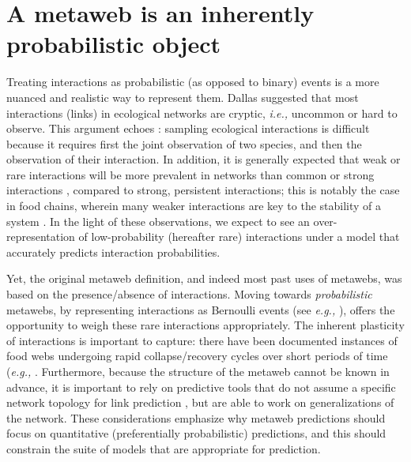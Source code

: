 \section{A metaweb is an inherently probabilistic
object}\label{a-metaweb-is-an-inherently-probabilistic-object}

Treating interactions as probabilistic (as opposed to binary) events is
a more nuanced and realistic way to represent them.
Dallas \cite{Dallas2017Predicting} suggested that most interactions (links) in
ecological networks are cryptic, \emph{i.e.,} uncommon or hard to
observe. This argument echoes \cite{Jordano2016Sampling}: sampling ecological
interactions is difficult because it requires first the joint
observation of two species, and then the observation of their
interaction. In addition, it is generally expected that weak or rare
interactions will be more prevalent in networks than common or strong
interactions \cite{Csermely2004Strong}, compared to strong, persistent
interactions; this is notably the case in food chains, wherein many
weaker interactions are key to the stability of a system
\cite{Neutel2002Stability}. In the light of these observations, we
expect to see an over-representation of low-probability (hereafter rare)
interactions under a model that accurately predicts interaction
probabilities.

Yet, the original metaweb definition, and indeed most past uses of
metawebs, was based on the presence/absence of interactions. Moving
towards \emph{probabilistic} metawebs, by representing interactions as
Bernoulli events (see \emph{e.g.,} \cite{Poisot2016Structure}), offers the
opportunity to weigh these rare interactions appropriately. The inherent
plasticity of interactions is important to capture: there have been
documented instances of food webs undergoing rapid collapse/recovery
cycles over short periods of time (\emph{e.g.,} \cite{Pedersen2017Signatures}.
Furthermore, because the structure of the metaweb cannot be known in
advance, it is important to rely on predictive tools that do not assume
a specific network topology for link prediction
\cite{Gaucher2021Outlier}, but are able to work on generalizations of
the network. These considerations emphasize why metaweb predictions
should focus on quantitative (preferentially probabilistic) predictions,
and this should constrain the suite of models that are appropriate for
prediction.

